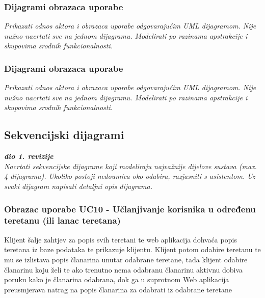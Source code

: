 				\subsubsection{Dijagrami obrazaca uporabe}
				
				\textit{Prikazati odnos aktora i obrazaca uporabe odgovarajućim UML dijagramom. Nije nužno nacrtati sve na jednom dijagramu. Modelirati po razinama apstrakcije i skupovima srodnih funkcionalnosti.}
				\eject	
				
				
					
				\subsubsection{Dijagrami obrazaca uporabe}
					
					\textit{Prikazati odnos aktora i obrazaca uporabe odgovarajućim UML dijagramom. Nije nužno nacrtati sve na jednom dijagramu. Modelirati po razinama apstrakcije i skupovima srodnih funkcionalnosti.}
				\eject		
				
			\subsection{Sekvencijski dijagrami}
				
				\textbf{\textit{dio 1. revizije}}\\
				
				\textit{Nacrtati sekvencijske dijagrame koji modeliraju najvažnije dijelove sustava (max. 4 dijagrama). Ukoliko postoji nedoumica oko odabira, razjasniti s asistentom. Uz svaki dijagram napisati detaljni opis dijagrama.}
				
					\subsubsection{Obrazac uporabe UC10 - Učlanjivanje korisnika u određenu teretanu (ili lanac teretana)}
					\textit{}Klijent šalje zahtjev za popis svih teretani te web aplikacija dohvaća popis teretana
                    iz baze podataka te prikazuje klijentu. Klijent potom odabire teretanu te mu se izlistava
                    popis članarina unutar odabrane teretane, tada klijent odabire članarinu koju želi te 
                    ako trenutno nema odabranu članarinu aktivnu dobiva poruku kako je članarina odabrana, 
                    dok ga u suprotnom Web aplikacija preusmjerava natrag na popis članarina za odabrati
                    iz odabrane teretane\\
                    
